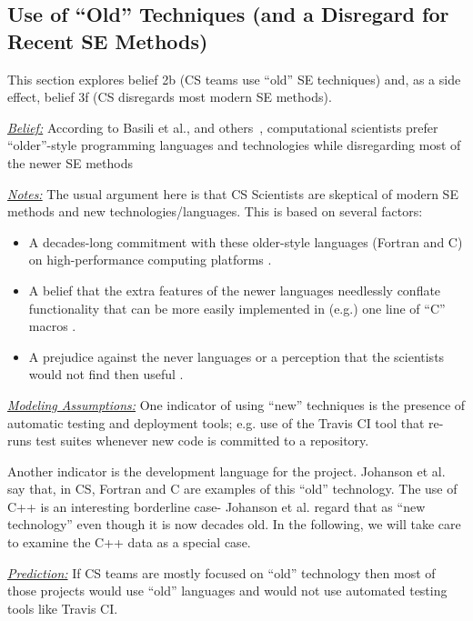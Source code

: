 \documentclass[sigconf,review,anonymous]{acmart}
\begin{document}
\subsection{Use of ``Old'' Techniques (and a Disregard for  Recent SE Methods)}
This section explores belief 2b (CS teams use ``old'' SE techniques)
and, as a side effect, belief 3f (CS disregards most modern SE methods).

\noindent \textit{\underline{Belief:}} According to Basili et al., and others~\cite{basili08_hpc, carver07_environment, Prabhu11_cssurvey, kendall05_C, ragan14_pythoncs},
computational scientists prefer
``older''-style programming languages and technologies while disregarding most of the newer SE methods

\noindent \textit{\underline{Notes:}} The usual argument here is that CS Scientists are skeptical of modern SE methods and new technologies/languages.
This is based on several factors: 
\begin{itemize}
  \item A decades-long commitment with these older-style languages (Fortran and C) on high-performance computing platforms \cite{faulk09_secs}.
  \item A belief that the extra features of the newer languages needlessly conflate functionality that can be more easily implemented in (e.g.) one line of ``C'' macros \cite{sanders08_risk}. 
  \item A prejudice against the never languages or a perception that the scientists would not find then useful \cite{Prabhu11_cssurvey}. 
\end{itemize}

\noindent \textit{\underline{Modeling Assumptions:}} 
One indicator of using ``new'' techniques is the presence of automatic testing and deployment tools; e.g. use of the Travis CI tool that re-runs test suites whenever new code is committed to a repository. 

Another indicator is the development language for the project. 
Johanson et al.~\cite{johan18_secs} say that, in CS, Fortran and C are examples of this ``old'' technology. The use of C++ is an interesting borderline case- Johanson et al. regard that as ``new technology'' even though it is now decades old. In the following, we will take care to examine the C++ data as a special case.




\noindent \textit{\underline{Prediction:}} If CS teams are mostly focused on ``old'' technology then most of those projects would use ``old'' languages and would not use automated testing
tools like  Travis CI.
\end{document}
